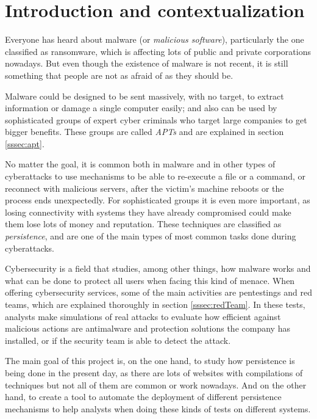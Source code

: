 \section{Introduction and contextualization}
\label{sec:introduction}

Everyone has heard about malware (or \textit{malicious software}), particularly the one classified as ransomware, which is affecting lots of public and private corporations nowadays. But even though the existence of malware is not recent, it is still something that people are not as afraid of as they should be.

Malware could be designed to be sent massively, with no target, to extract information or damage a single computer easily; and also can be used by sophisticated groups of expert cyber criminals who target large companies to get bigger benefits. These groups are called \textit{APTs} and are explained in section \ref{sssec:apt}.

No matter the goal, it is common both in malware and in other types of cyberattacks to use mechanisms to be able to re-execute a file or a command, or reconnect with malicious servers, after the victim's machine reboots or the process ends unexpectedly. For sophisticated groups it is even more important, as losing connectivity with systems they have already compromised could make them lose lots of money and reputation. These techniques are classified as \textit{persistence}, and are one of the main types of most common tasks done during cyberattacks.

Cybersecurity is a field that studies, among other things, how malware works and what can be done to protect all users when facing this kind of menace. 
When offering cybersecurity services, some of the main activities are pentestings and red teams, which are explained thoroughly in section \ref{sssec:redTeam}. In these tests, analysts make simulations of real attacks to evaluate how efficient against malicious actions are antimalware and protection solutions the company has installed, or if the security team is able to detect the attack. 

The main goal of this project is, on the one hand, to study how persistence is being done in the present day, as there are lots of websites with compilations of techniques but not all of them are common or work nowadays. And on the other hand, to create a tool to automate the deployment of different persistence mechanisms to help analysts when doing these kinds of tests on different systems.

